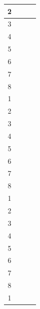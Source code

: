\documentclass[11pt, a4paper]{article}
\begin{document}
\begin{landscape}
\begin{longtable}{|c|c|c|c|}
       2&         &                 &                    \\ \hline
       3&         &                 &                     \\ \hline
       4&         &                 &                    \\ \hline
       5&         &                 &                     \\ \hline
       6&         &                 &                    \\ \hline
       7&         &                 &                     \\ \hline
       8&         &                 &                    \\ \hline
       1&         &                 &                     \\ \hline
       2&         &                 &                    \\ \hline
       3&         &                 &                     \\ \hline
       4&         &                 &                    \\ \hline
       5&         &                 &                     \\ \hline
       6&         &                 &                    \\ \hline
       7&         &                 &                     \\ \hline
       8&         &                 &                    \\ \hline
       1&         &                 &                     \\ \hline
       2&         &                 &                    \\ \hline
       3&         &                 &                     \\ \hline
       4&         &                 &                    \\ \hline
       5&         &                 &                     \\ \hline
       6&         &                 &                    \\ \hline
       7&         &                 &                     \\ \hline
       8&         &                 &                    \\ \hline
       1&         &                 &                     \\ \hline
       

\end{longtable}
\end{landscape}
\end{document}
